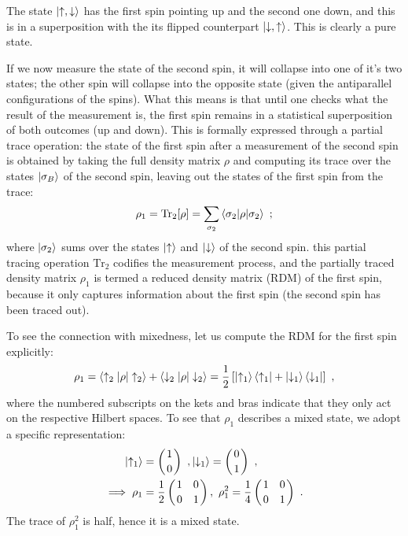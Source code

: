 The state $ \ket{\uparrow,\downarrow} $ has the first spin pointing up and the second one down, and this is in a superposition with the its flipped counterpart $ \ket{\downarrow,\uparrow} $. This is clearly a pure state.

If we now measure the state of the second spin, it will collapse into one of it's two states; the other spin will collapse into the opposite state (given the antiparallel configurations of the spins). What this means is that until one checks what the result of the measurement is, the first spin remains in a statistical superposition of both outcomes (up and down). This is formally expressed through a partial trace operation: the state of the first spin after a measurement of the second spin is obtained by taking the full density matrix $ \rho $ and computing its trace over the states $ \ket{\sigma_B}$ of the second spin, leaving out the states of the first spin from the trace:
\begin{equation}\begin{aligned}
\rho_1 = \text{Tr}_2 [\rho ] = \sum_{\sigma_2} \braket{\sigma_2 \vert \rho \vert \sigma_2}~;
\end{aligned}\end{equation}
where $ \ket{\sigma_2}$ sums over the states $\ket{\uparrow}$ and $\ket{\downarrow}$ of the second spin. this partial tracing operation $ \text{Tr}_2 $ codifies the measurement process, and the partially traced density matrix $ \rho_1 $ is termed a reduced density matrix (RDM) of the first spin, because it only captures information about the first spin (the second spin has been traced out).

To see the connection with mixedness, let us compute the RDM for the first spin explicitly:
\begin{equation}\begin{aligned}
\rho_1 = \braket{\uparrow_2 \vert \rho \vert \uparrow_2} + \braket{\downarrow_2 \vert \rho \vert \downarrow_2} = \frac{1}{2}\left[\ket{\uparrow_1}\bra{\uparrow_1} + \ket{\downarrow_1}\bra{\downarrow_1}\right]~,
\end{aligned}\end{equation}
where the numbered subscripts on the kets and bras indicate that they only act on the respective Hilbert spaces. To see that $ \rho_1 $ describes a mixed state, we adopt a specific representation:
\begin{equation}\begin{aligned}
	\ket{\uparrow_1} &= \left(1 \atop{0} \right)~, \ket{\downarrow_1} = \left(0 \atop{1} \right)~,\\
	\implies \rho_1 &= \frac{1}{2}\left({1 \quad 0}\atop{0 \quad 1}\right),~ \rho_1^2 = \frac{1}{4}\left({1 \quad 0}\atop{0 \quad 1}\right)~.
\end{aligned}\end{equation}
The trace of $ \rho_1^2 $ is half, hence it is a mixed state.

